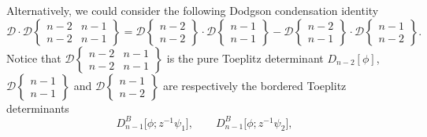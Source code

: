 \documentclass[pdftex]{sigma}
\numberwithin{equation}{section}
\begin{document}
	\begin{Remark}
		Alternatively, we could consider the following Dodgson condensation identity
		\begin{equation}\label{DODGSON2}
			\mathscr{D} \cdot \mathscr{D}\left\lbrace \begin{matrix} n-2 & n-1 \\ n-2& n-1 \end{matrix} \right\rbrace = \mathscr{D}\left\lbrace \begin{matrix} n-2 \\ n-2 \end{matrix} \right\rbrace \cdot \mathscr{D}\left\lbrace \begin{matrix} n-1 \\ n-1 \end{matrix} \right\rbrace - \mathscr{D}\left\lbrace \begin{matrix} n-2 \\ n-1 \end{matrix} \right\rbrace \cdot \mathscr{D}\left\lbrace \begin{matrix} n-1 \\ n-2 \end{matrix} \right\rbrace.
		\end{equation}
		Notice that $\mathscr{D}\left\lbrace \begin{smallmatrix} n-2 & n-1 \\ n-2& n-1 \end{smallmatrix} \right\rbrace$ is the pure Toeplitz determinant $D_{n-2}[\phi]$, $ \mathscr{D}\left\lbrace \begin{smallmatrix} n-1 \\ n-1 \end{smallmatrix} \right\rbrace$ and $ \mathscr{D}\left\lbrace \begin{smallmatrix} n-1 \\ n-2 \end{smallmatrix} \right\rbrace$ are respectively the bordered Toeplitz determinants
		\[ D^B_{n-1}\big[\phi;z^{-1}\psi_1\big],\qquad D^B_{n-1}\big[\phi;z^{-1}\psi_2\big],\]

\end{Remark}
\end{document}
